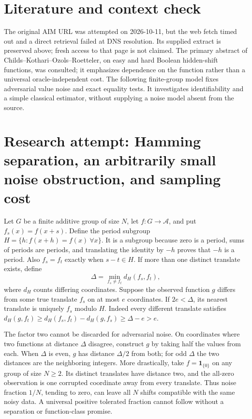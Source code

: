 \documentclass[11pt]{article}
\begin{document}
\section{Literature and context check}
The original AIM URL was attempted on 2026-10-11, but the web fetch timed out and a direct retrieval failed at DNS resolution. Its supplied extract is preserved above; fresh access to that page is not claimed. The primary abstract of Childs--Kothari--Ozols--Roetteler, on easy and hard Boolean hidden-shift functions, was consulted; it emphasizes dependence on the function rather than a universal oracle-independent cost. The following finite-group model fixes adversarial value noise and exact equality tests. It investigates identifiability and a simple classical estimator, without supplying a noise model absent from the source.
\section{Research attempt: Hamming separation, an arbitrarily small noise obstruction, and sampling cost}
Let $G$ be a finite additive group of size $N$, let $f:G\to\mathcal A$, and put $f_s(x)=f(x+s)$. Define the period subgroup $H=\{h:f(x+h)=f(x)\ \forall x\}$. It is a subgroup because zero is a period, sums of periods are periods, and translating the identity by $-h$ proves that $-h$ is a period. Also $f_s=f_t$ exactly when $s-t\in H$. If more than one distinct translate exists, define
\[
 \Delta=\min_{f_s\ne f_t}d_H(f_s,f_t),
\]
where $d_H$ counts differing coordinates. Suppose the observed function $g$ differs from some true translate $f_s$ on at most $e$ coordinates. If $2e<\Delta$, its nearest translate is uniquely $f_s$ modulo $H$. Indeed every different translate satisfies
$d_H(g,f_t)\geq d_H(f_s,f_t)-d_H(g,f_s)\geq\Delta-e>e$.

The factor two cannot be discarded for adversarial noise. On coordinates where two functions at distance $\Delta$ disagree, construct $g$ by taking half the values from each. When $\Delta$ is even, $g$ has distance $\Delta/2$ from both; for odd $\Delta$ the two distances are the neighboring integers. More drastically, take $f=\mathbf1_{\{0\}}$ on any group of size $N\geq2$. Its distinct translates have distance two, and the all-zero observation is one corrupted coordinate away from every translate. Thus noise fraction $1/N$, tending to zero, can leave all $N$ shifts compatible with the same noisy data. A universal positive tolerated fraction cannot follow without a separation or function-class promise.
\end{document}
